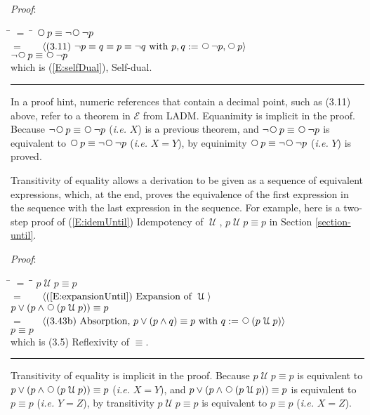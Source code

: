 \documentclass[12pt, fleqn, leqno]{article}
\newcommand{\lgap}{2pt}                             %
\newcommand{\mymathindent}{24pt}                    %
\newcommand{\Until}{\;\mathcal{U}\;}
\newcommand{\Next}{\;\,\text{\raisebox{3.5pt}{\circle{6}}}}
\newcommand{\myqed}{\rule[-.23ex]{1.2ex}{2.0ex}}
\newcommand{\myqedtab}{\hspace{384pt}}              %
\newcommand{\Gll} {\langle}                         %
\newcommand{\Ggg} {\rangle}                         %
\newcommand{\Hint}[1]     {\ \ \ $\Gll              \mbox{#1} \Ggg$ }   %
\begin{document}
\emph{Proof}:
\begin{tabbing}
\hspace{\mymathindent} \= $= \;$ \= \kill
  \> \>   $\Next p \equiv \neg\Next\neg p$\\[\lgap]
  \> $=$  \>  \Hint{(3.11) $\neg p \equiv q \equiv p \equiv \neg q$ with $p,q := \Next\neg p, \Next p$} \\[\lgap]
  \> \>   $\neg\Next p \equiv \Next\neg p$ \\[\lgap]
  \> which is (\ref{E:selfDual}), Self-dual. \quad \myqed
\end{tabbing}
In a proof hint, numeric references that contain a decimal point, such as (3.11) above, refer to a theorem in $\mathcal{E}$ from LADM.
Equanimity is implicit in the proof.
Because $\neg\Next p \equiv \Next\neg p$ (\textit{i.e.} $X$) is a previous theorem, and $\neg\Next p \equiv \Next\neg p$ is equivalent to $\Next p \equiv \neg\Next\neg p$ (\textit{i.e.} $X=Y$), by equinimity $\Next p \equiv \neg\Next\neg p$ (\textit{i.e.} $Y$) is proved.

Transitivity of equality allows a derivation to be given as a sequence of equivalent expressions, which, at the end,
proves the equivalence of the first expression in the sequence with the last expression in the sequence.
For example, here is a two-step proof of (\ref{E:idemUntil}) Idempotency of $\Until$, $p \Until p \equiv p$ in Section \ref{section-until}.

\emph{Proof}:
\begin{tabbing}
\hspace{\mymathindent} \= $= \;$ \= \myqedtab \= \kill
  \> \>   $p \Until p\equiv p$\\[\lgap]
  \> $=$  \>  \Hint{(\ref{E:expansionUntil}) Expansion of $\Until$}\\[\lgap]
  \> \>   $p \lor (p \land \Next(p \Until p))\equiv p$\\[\lgap]
  \> $=$  \>  \Hint{(3.43b) Absorption, $p \lor (p \land q) \equiv p$ with $q := \Next (p \Until p)$}\\[\lgap]
  \> \>   $p\equiv p$\\[\lgap]
  \> which is (3.5) Reflexivity of $\equiv$. \quad \myqed
\end{tabbing}
Transitivity of equality is implicit in the proof.
Because $p \Until p\equiv p$ is equivalent to $p \lor (p \land \Next(p \Until p))\equiv p$ (\textit{i.e.} $X=Y$),
and $p \lor (p \land \Next(p \Until p))\equiv p$ is equivalent to $p\equiv p$ (\textit{i.e.} $Y=Z$),
by transitivity $p \Until p\equiv p$ is equivalent to $p\equiv p$ (\textit{i.e.} $X=Z$).
\end{document}
